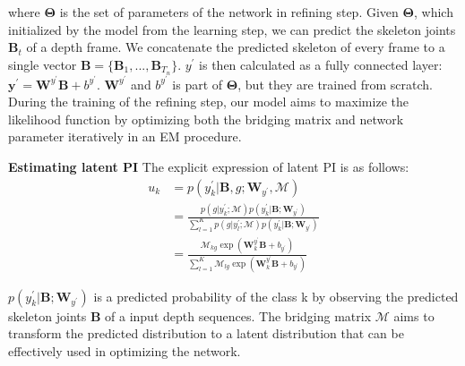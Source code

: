 \documentclass[10pt,twocolumn,letterpaper]{article}
\begin{document}
where $\bm{\Theta}$ is the set of parameters of the network in refining step. Given $\bm{\Theta}$, which initialized by the model from the learning step, we can predict the skeleton joints $\bm{B}_t$ of a depth frame. We concatenate the predicted skeleton of every frame to a single vector $\bm{B}=\{\bm{B}_{1},...,\bm{B}_{T_n}\}$. $y^{\prime}$ is then calculated as a fully connected layer: $\bm{y^{\prime}}=\bm{W}^{y^{\prime}}\bm{B}+b^{y^{\prime}}$. $\bm{W}^{y^{\prime}}$ and $b^{y^{\prime}}$ is part of $\bm{\Theta}$, but they are trained from scratch. During the training of the refining step, our model aims to maximize the likelihood function by optimizing both the bridging matrix and network parameter iteratively in an EM procedure. 


\noindent \textbf{Estimating latent PI} The explicit expression of latent PI is as follows: 
\begin{align}
u_k &= p(y_k^{\prime} | \bm{B}, g ; \bm{W}_{y^{\prime}}, \bm{\mathcal{M}}) \nonumber \\
&= \frac{p(g|y_k^{\prime};\bm{\mathcal{M}})p(y_k^{\prime}|\bm{B}; \bm{W}_{y^{\prime}})}{\sum_{l=1}^{K}p(g|y_l^{\prime};\bm{\mathcal{M}})p(y_k^{\prime}|\bm{B};\bm{W}_{y^{\prime}})} \nonumber \\
&= \frac{\bm{\mathcal{M}}_{kg}\exp(\bm{W}_k^{y^{\prime}}\bm{B}+b_{y^{\prime}})}{\sum_{l=1}^{K}\bm{\mathcal{M}}_{lg}\exp(\bm{W}_k^{y^{\prime}}\bm{B}+b_{y^{\prime}})}
\label{eq:estep}
\end{align}

$p(y_k^{\prime}|\bm{B}; \bm{W}_{y^{\prime}})$ is a predicted probability of the class k by observing the predicted skeleton joints $\bm{B}$ of a input depth sequences. The bridging matrix $\bm{\mathcal{M}}$ aims to transform the predicted distribution to a latent distribution that can be effectively used in optimizing the network.


\setlength{\textfloatsep}{0.3cm}
\end{document}
